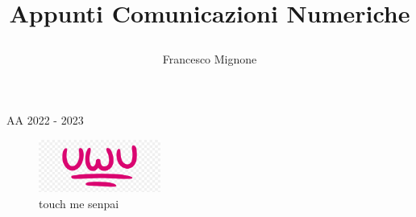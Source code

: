 \title{\bf Appunti Comunicazioni Numeriche \par}
\author{Francesco Mignone}
\date{}
\begin{titlepage}

    \maketitle    

    \begin{center}
        AA 2022 - 2023
        \vfill
        \begin{figure}[htp]
            \centering
            \includegraphics[width=4cm]{media/uwu.png}
            \caption{touch me senpai}
            \label{fig:uwu}
        \end{figure}
    \end{center}

\end{titlepage}
